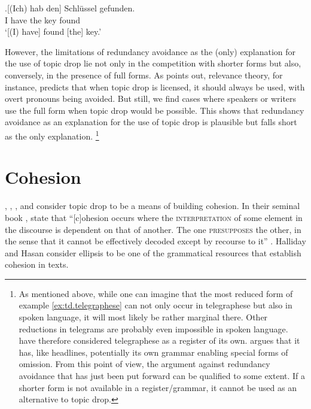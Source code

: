 \largerpage[-1]

\exg.\label{ex:td.telegraphese}[(Ich) hab den] Schlüssel gefunden.\\
I have the key found\\
`[(I) have] found [the] key.'

However, the limitations of redundancy avoidance as the (only) explanation for the use of topic drop lie not only in the competition with shorter forms but also, conversely, in the presence of full forms.
As \citet[198]{helmer2016}  points out, relevance theory,  for instance, predicts that when topic drop is licensed, it should always be used, with overt pronouns being avoided.
But still, we find cases where speakers or writers use the full form when topic drop would be possible.
This shows that redundancy avoidance as an explanation for the use of topic drop is plausible but falls short as the only explanation.%
\footnote{As mentioned above, while one can imagine that the most reduced form of example \ref{ex:td.telegraphese} can not only occur in telegraphese but also in spoken language, it will most likely be rather marginal there.
Other reductions in telegrams are probably even impossible in spoken language.
\citet[1124]{tesak.dittmann1991} have therefore considered telegraphese as a register of its own.
\citet[404]{heidolph1992} argues that it has, like headlines, potentially its own grammar enabling special forms of omission.
From this point of view, the argument against redundancy avoidance that has just been put forward can be qualified to some extent.
If a shorter form is not available in a register/grammar, it cannot be used as an alternative to topic drop.
}

\section{Cohesion}\label{sec:pusage.cohesion}
\citet{auer1993}, \citet{sandig2000}, \citet{helmer2016}, and \citet{frick2017} consider topic drop to be a means of building cohesion.
In their seminal book , \citet{halliday.hasan1976} state that ``[c]ohesion occurs where the \textsc{interpretation} of some element in the discourse is dependent on that of another. The one \textsc{presupposes} the other, in the sense that it cannot be effectively decoded except by recourse to it'' \citep[4, original emphasis]{halliday.hasan1976}.
Halliday and Hasan consider ellipsis to be one of the grammatical resources that establish cohesion in texts.

